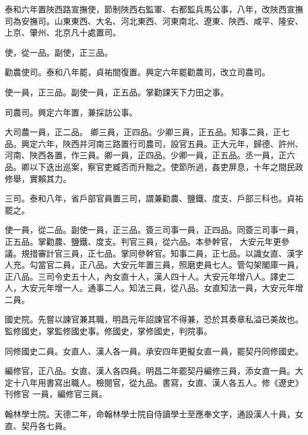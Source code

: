 \begin{pinyinscope}
 泰和六年置陜西路宣撫使，節制陜西右監軍、右都監兵馬公事，八年，改陜西宣撫司為安撫司。山東東西、大名、河北東西、河東南北、遼東、陜西、咸平、隆安、上京、肇州、北京凡十處置司。



 使，從一品。副使，正三品。



 勸農使司。泰和八年罷，貞祐間復置。興定六年罷勸農司，改立司農司。



 使一員，正三品。副使一員，正五品。掌勸課天下力田之事。



 司農司。興定六年置，兼採訪公事。



 大司農一員，正二品。
 卿三員，正四品。少卿三員，正五品。知事二員，正七品。興定六年，陜西并河南三路置行司農司，設官五員。正大元年，歸德、許州、河南、陜西各置，作三員。卿一員，正四品。少卿一員，正五品。丞一員，正六品。卿以下迭出巡案，察官吏臧否而升黜之。使節所過，姦吏屏息，十年之間民政修舉，實賴其力。



 三司。泰和八年，省戶部官員置三司，謂兼勸農、鹽鐵、度支、戶部三科也。貞祐罷之。



 使一員，從二品。副使一員，正三品。簽三司事一員，正四品。同簽三司事一員，正五品。掌勸農、鹽鐵、度支。判官三員，從六品。本參幹官，
 大安元年更參議。規措審計官三員，正七品。掌同參幹官。知事二員，正七品。以識女直、漢字人充。勾當官二員，正八品。大安元年置三員，照磨吏員七人。管勾架閣庫一員，正八品。三司令史五十人，內女直十人，漢人四十人。大安元年增八人。譯史二人，大安元年增一人。通事二人。知法三員，從八品。女直知法一員，大安元年增二員。



 國史院。先嘗以諫官兼其職，明昌元年詔諫官不得兼，恐於其奏章私溢已美故也。監修國史，掌監修國史事。修國史，掌修國史，判院事。



 同修國史二員。女直人、漢人各一員。承安四年更擬女直一員，罷契丹同修國史。



 編修官，正八品。女直、漢人各四員。明昌二年罷契丹編修三員，添女直一員。大定十八年用書寫出職人。檢閱官，從九品。書寫，女直、漢人各五人。修《遼史》刊修官
 一員，編修官三員。



 翰林學士院。天德二年，命翰林學士院自侍讀學士至應奉文字，通設漢人十員，女直、契丹各七員。




\end{pinyinscope}
